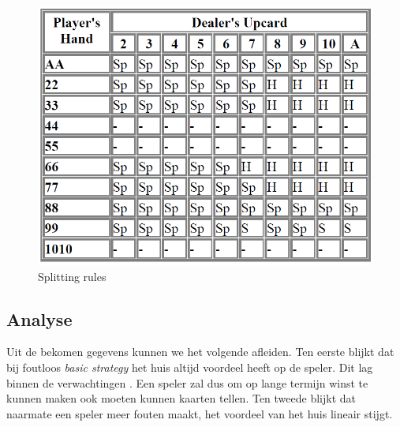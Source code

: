 \documentclass[conference]{IEEEtran}
\begin{document}
\begin{figure}[H]
	\includegraphics[width=\linewidth]{img/SplittingRules}
  	\caption{Splitting rules}
  	\label{fig:splittingRules}
\end{figure}

\subsection{Analyse}
Uit de bekomen gegevens kunnen we het volgende afleiden. Ten eerste blijkt dat bij foutloos \textit{basic strategy} het huis altijd voordeel heeft op de speler. Dit lag binnen de verwachtingen \cite{fogel2004evolving}. Een speler zal dus om op lange termijn winst te kunnen maken ook moeten kunnen kaarten tellen. Ten tweede blijkt dat naarmate een speler meer fouten maakt, het voordeel van het huis lineair stijgt.
\end{document}
